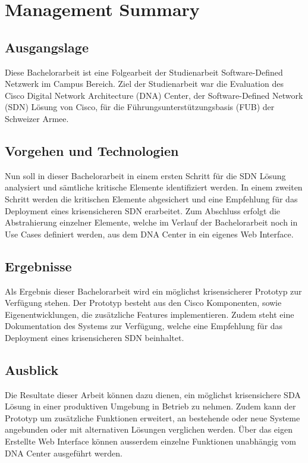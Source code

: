 \section{Management Summary}

\subsection{Ausgangslage}
Diese Bachelorarbeit ist eine Folgearbeit der Studienarbeit Software-Defined Netzwerk im Campus Bereich. Ziel der Studienarbeit war die Evaluation des Cisco Digital Network Architecture (DNA) Center, der Software-Defined Network (SDN) Lösung von Cisco, für die Führungsunterstützungsbasis (FUB) der Schweizer Armee. 

\subsection{Vorgehen und Technologien}
Nun soll in dieser Bachelorarbeit in einem ersten Schritt für die SDN Lösung analysiert und sämtliche kritische Elemente identifiziert werden. In einem zweiten Schritt werden die kritischen Elemente abgesichert und eine Empfehlung für das Deployment eines krisensicheren SDN erarbeitet. Zum Abschluss erfolgt die Abstrahierung einzelner Elemente, welche im Verlauf der Bachelorarbeit noch in Use Cases definiert werden, aus dem DNA Center in ein eigenes Web Interface.

\subsection{Ergebnisse}
Als Ergebnis dieser Bachelorarbeit wird ein möglichst krisensicherer Prototyp zur Verfügung stehen. Der Prototyp besteht aus den Cisco Komponenten, sowie Eigenentwicklungen, die zusätzliche Features implementieren. Zudem steht eine Dokumentation des Systems zur Verfügung, welche eine Empfehlung für das Deployment eines krisensicheren SDN beinhaltet.

\subsection{Ausblick}
Die Resultate dieser Arbeit können dazu dienen, ein möglichst krisensichere SDA Lösung in einer produktiven Umgebung in Betrieb zu nehmen. Zudem kann der Prototyp um zusätzliche Funktionen erweitert, an bestehende oder neue Systeme angebunden oder mit alternativen Lösungen verglichen werden. Über das eigen Erstellte Web Interface können ausserdem einzelne Funktionen unabhängig vom DNA Center ausgeführt werden.
 
